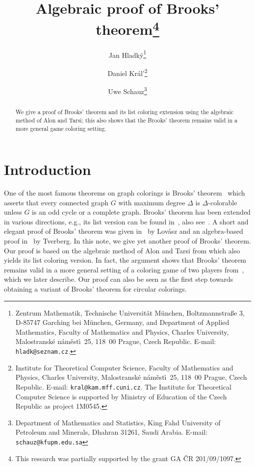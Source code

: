 \documentclass[10pt]{article}
\begin{document}
\title{Algebraic proof of Brooks' theorem\thanks{This research was partially supported by the grant GA {\v C}R 201/09/1097.}}
\author{Jan Hladk{\'y}\thanks{Zentrum Mathematik, Technische Universit\"at M\"unchen, Boltzmannstra\ss e 3, D-85747 Garching bei M\"unchen, Germany, and Department of Applied Mathematics, Faculty of Mathematics and Physics, Charles University, Malostransk\'e n\'am\v{e}st\'{\i}~25, 118~00 Prague, Czech Republic. E-mail: {\tt hladk@seznam.cz}.} \and
        Daniel Kr{\'a}l'\thanks{Institute for Theoretical Computer Science, Faculty of Mathematics and Physics, Charles University, Malostransk\'e n\'am\v{e}st\'{\i}~25, 118~00 Prague, Czech Republic. E-mail: {\tt kral@kam.mff.cuni.cz}. The Institute for Theoretical Computer Science is supported by Ministry of Education of the Czech Republic as project 1M0545.}\and
	Uwe Schauz\thanks{Department of Mathematics and Statistics, King Fahd University of Petroleum and Minerals, Dhahran 31261, Saudi Arabia. E-mail: {\tt schauz@kfupm.edu.sa}}}
\date{}
\maketitle
\begin{abstract}
We give a proof of Brooks' theorem and its list coloring extension
using the algebraic method of Alon and Tarsi; this also shows that
the Brooks' theorem remains valid in a more general game coloring setting.
\end{abstract}

\section{Introduction}

One of the most famous theorems on graph colorings is Brooks' theorem~\cite{bib-brooks41}
which asserts that every connected graph $G$ with maximum degree $\Delta$ is $\Delta$-colorable
unless $G$ is an odd cycle or a complete graph. Brooks' theorem has been extended in various
directions, e.g., its list version can be found in~\cite{bib-vizing76}, also see~\cite{bib-kostochka96+}.
A short and elegant proof of Brooks' theorem was given in~\cite{bib-lovasz75} by Lov{\'a}sz and
an algebra-based proof in~\cite{bib-tverberg} by Tverberg.
In this note, we give yet another proof of Brooks' theorem.
Our proof is based on the algebraic method of Alon and Tarsi
from \cite{bib-alon92+} which also yields its list coloring version. In fact,
the argument shows that Brooks' theorem remains valid in a more general
setting of a coloring game of two players from~\cite{bib-uwe09,bib-uwe}, which we later describe.
Our proof can also be seen as the first step towards obtaining a variant of Brooks' theorem
for circular colorings.
\end{document}
